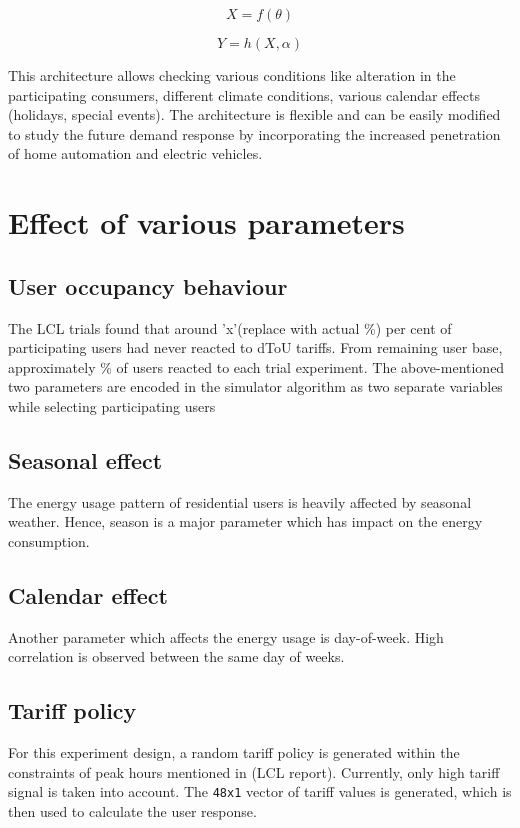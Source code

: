 \begin{equation}
    X = f(\theta)
\end{equation}
    
\begin{equation}
     Y = h(X, \alpha)
\end{equation}

This architecture allows checking various conditions like alteration in the participating consumers, different climate conditions, various calendar effects (holidays, special events). The architecture is flexible and can be easily modified to study the future demand response by incorporating the increased penetration of home automation and electric vehicles.

\section{Effect of various parameters}
\subsection{User occupancy behaviour}
The LCL trials found that around 'x'(replace with actual \%) per cent of participating users had never reacted to dToU tariffs. From remaining user base, approximately \% of users reacted to each trial experiment. The above-mentioned two parameters are encoded in the simulator algorithm as two separate variables while selecting participating users

\subsection{Seasonal effect}
The energy usage pattern of residential users is heavily affected by seasonal weather. Hence, season is a major parameter which has impact on the energy consumption.

\subsection{Calendar effect}
Another parameter which affects the energy usage is day-of-week. High correlation is observed between the same day of weeks. 

\subsection{Tariff policy}
For this experiment design, a random tariff policy is generated within the constraints of peak hours mentioned in (LCL report). Currently, only high tariff signal is taken into account. The \texttt{48x1} vector of tariff values is generated, which is then used to calculate the user response.


